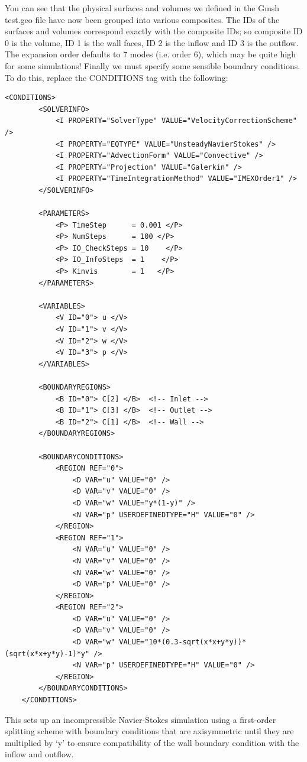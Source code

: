 You can see that the physical surfaces and volumes we defined in the Gmsh test.geo file have now been grouped into various composites. The IDs of the surfaces and volumes correspond exactly with the composite IDs; so composite ID 0 is the volume, ID 1 is the wall faces, ID 2 is the inflow and ID 3 is the outflow.
The expansion order defaults to 7 modes (i.e. order 6), which may be quite high for some simulations!
Finally we must specify some sensible boundary conditions. To do this, replace the CONDITIONS tag with the following:
\begin{lstlisting}[style=XmlStyle]
 <CONDITIONS>
        <SOLVERINFO>
            <I PROPERTY="SolverType" VALUE="VelocityCorrectionScheme" />
            <I PROPERTY="EQTYPE" VALUE="UnsteadyNavierStokes" />
            <I PROPERTY="AdvectionForm" VALUE="Convective" />
            <I PROPERTY="Projection" VALUE="Galerkin" />
            <I PROPERTY="TimeIntegrationMethod" VALUE="IMEXOrder1" />
        </SOLVERINFO>

        <PARAMETERS>
            <P> TimeStep      = 0.001 </P>
            <P> NumSteps      = 100 </P>
            <P> IO_CheckSteps = 10    </P>
            <P> IO_InfoSteps  = 1    </P>
            <P> Kinvis        = 1   </P>
        </PARAMETERS>

        <VARIABLES>
            <V ID="0"> u </V>
            <V ID="1"> v </V>
            <V ID="2"> w </V>
            <V ID="3"> p </V>
        </VARIABLES>

        <BOUNDARYREGIONS>
            <B ID="0"> C[2] </B>  <!-- Inlet -->
            <B ID="1"> C[3] </B>  <!-- Outlet -->
            <B ID="2"> C[1] </B>  <!-- Wall -->
        </BOUNDARYREGIONS>

        <BOUNDARYCONDITIONS>
            <REGION REF="0">
                <D VAR="u" VALUE="0" />
                <D VAR="v" VALUE="0" />
                <D VAR="w" VALUE="y*(1-y)" />
                <N VAR="p" USERDEFINEDTYPE="H" VALUE="0" />
            </REGION>
            <REGION REF="1">
                <N VAR="u" VALUE="0" />
                <N VAR="v" VALUE="0" />
                <N VAR="w" VALUE="0" />
                <D VAR="p" VALUE="0" />
            </REGION>
            <REGION REF="2">
                <D VAR="u" VALUE="0" />
                <D VAR="v" VALUE="0" />
                <D VAR="w" VALUE="10*(0.3-sqrt(x*x+y*y))*(sqrt(x*x+y*y)-1)*y" />
                <N VAR="p" USERDEFINEDTYPE="H" VALUE="0" />
            </REGION>
        </BOUNDARYCONDITIONS>
    </CONDITIONS>
\end{lstlisting}
This sets up an incompressible Navier-Stokes simulation using a first-order splitting scheme with boundary conditions that are axisymmetric until they are multiplied by `y' to ensure compatibility of the wall boundary condition with the inflow and outflow.

